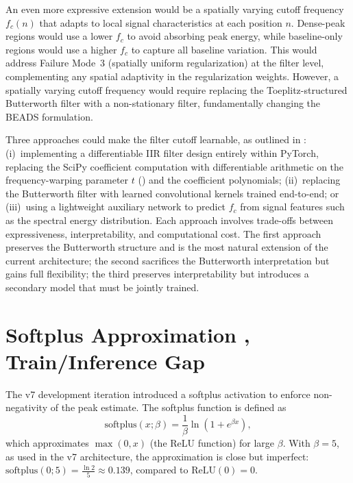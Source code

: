 An even more expressive extension would be a spatially varying cutoff frequency $f_c(n)$ that adapts to local signal characteristics at each position $n$. Dense-peak regions would use a lower $f_c$ to avoid absorbing peak energy, while baseline-only regions would use a higher $f_c$ to capture all baseline variation. This would address Failure Mode~3 (spatially uniform regularization) at the filter level, complementing any spatial adaptivity in the regularization weights. However, a spatially varying cutoff frequency would require replacing the Toeplitz-structured Butterworth filter with a non-stationary filter, fundamentally changing the BEADS formulation.

Three approaches could make the filter cutoff learnable, as outlined in : (i)~implementing a differentiable IIR filter design entirely within PyTorch, replacing the SciPy coefficient computation with differentiable arithmetic on the frequency-warping parameter $t$ () and the coefficient polynomials; (ii)~replacing the Butterworth filter with learned convolutional kernels trained end-to-end; or (iii)~using a lightweight auxiliary network to predict $f_c$ from signal features such as the spectral energy distribution. Each approach involves trade-offs between expressiveness, interpretability, and computational cost. The first approach preserves the Butterworth structure and is the most natural extension of the current architecture; the second sacrifices the Butterworth interpretation but gains full flexibility; the third preserves interpretability but introduces a secondary model that must be jointly trained.


\section{Softplus Approximation ,  Train/Inference Gap}
\label{sec:disc_softplus}

The v7 development iteration introduced a softplus activation to enforce non-negativity of the peak estimate. The softplus function is defined as
\begin{equation}
    \text{softplus}(x; \beta) = \frac{1}{\beta} \ln(1 + e^{\beta x}),
\end{equation}
which approximates $\max(0, x)$ (the ReLU function) for large $\beta$. With $\beta = 5$, as used in the v7 architecture, the approximation is close but imperfect: $\text{softplus}(0; 5) = \frac{\ln 2}{5} \approx 0.139$, compared to $\text{ReLU}(0) = 0$.

